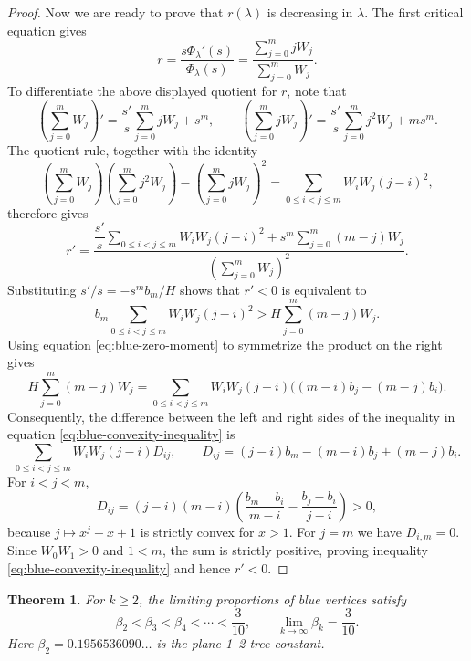\documentclass[10pt,a4paper]{amsart}
\newtheorem{theorem}{Theorem}[section]
\theoremstyle{remark}
\begin{document}
\begin{proof}
Now we are ready to prove that $r(\lambda)$ is decreasing in $\lambda$.
The first critical equation gives
\[
r=\frac{s\Phi_\lambda'(s)}{\Phi_\lambda(s)}
=\frac{\sum_{j=0}^m jW_j}{\sum_{j=0}^m W_j}.
\]
To differentiate the above displayed quotient for $r$, note that
\[
\left(\sum_{j=0}^m W_j\right)'
=\frac{s'}s\sum_{j=0}^m jW_j+s^m,
\qquad
\left(\sum_{j=0}^m jW_j\right)'
=\frac{s'}s\sum_{j=0}^m j^2W_j+ms^m.
\]
The quotient rule, together with the identity
\[
\left(\sum_{j=0}^m W_j\right)
\left(\sum_{j=0}^m j^2W_j\right)
-\left(\sum_{j=0}^m jW_j\right)^2
=\sum_{0\leq i<j\leq m}W_iW_j(j-i)^2,
\]
therefore gives
\[
r'=\frac{
\dfrac{s'}s\displaystyle\sum_{0\leq i<j\leq m}W_iW_j(j-i)^2
+s^m\displaystyle\sum_{j=0}^m(m-j)W_j
}{\left(\displaystyle\sum_{j=0}^m W_j\right)^2}.
\]
Substituting $s'/s=-s^m b_m/H$ shows that $r'<0$ is equivalent to
\begin{equation}\label{eq:blue-convexity-inequality}
b_m\sum_{0\leq i<j\leq m}W_iW_j(j-i)^2
>H\sum_{j=0}^m(m-j)W_j.
\end{equation}
Using equation \eqref{eq:blue-zero-moment} to symmetrize the product
on the right gives
\[
H\sum_{j=0}^m(m-j)W_j
=\sum_{0\leq i<j\leq m}W_iW_j(j-i)
\bigl((m-i)b_j-(m-j)b_i\bigr).
\]
Consequently, the difference between the left and right sides of the inequality in equation
\eqref{eq:blue-convexity-inequality} is
\[
\sum_{0\leq i<j\leq m}W_iW_j(j-i)D_{ij},
\qquad
D_{ij}=(j-i)b_m-(m-i)b_j+(m-j)b_i.
\]
For $i<j<m$,
\[
D_{ij}=(j-i)(m-i)
\left(\frac{b_m-b_i}{m-i}-\frac{b_j-b_i}{j-i}\right)>0,
\]
because $j\mapsto x^j-x+1$ is strictly convex for $x>1$.
For $j=m$ we have $D_{i,m}=0$. Since $W_0W_1>0$ and $1<m$,
the sum is strictly positive, proving inequality
\eqref{eq:blue-convexity-inequality} and hence $r'<0$.
\end{proof}



\begin{theorem}\label{blue-monotone}
For $k\geq2$, the limiting proportions of blue vertices satisfy
\[
\beta_2<\beta_3<\beta_4<\cdots<\frac3{10},
\qquad \lim_{k\to\infty}\beta_k=\frac3{10}.
\]
Here $\beta_2=0.1956536090\ldots$ is the plane 1--2-tree constant.
\end{theorem}
\end{document}
